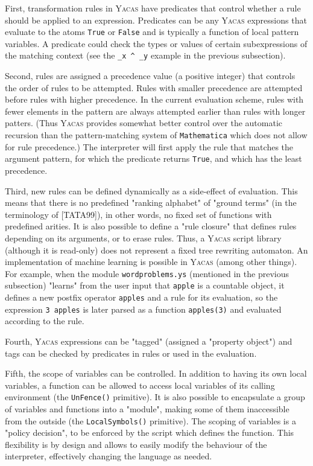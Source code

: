 \documentclass{llncs}
\begin{document}
First, transformation rules in \textsc{Yacas} have predicates that control whether a
rule should be applied to an expression. Predicates can be any \textsc{Yacas}
expressions that evaluate to the atoms \texttt{True} or \texttt{False} and is typically a
function of local pattern variables. A predicate could check the types or
values of certain subexpressions of the matching context (see the \verb|_x ^ _y|
example in the previous subsection).


Second, rules are assigned a precedence value (a positive integer) that
controls the order of rules to be attempted. Rules with smaller precedence are
attempted before rules with higher precedence. In the current evaluation
scheme, rules with fewer elements in the pattern are always attempted earlier
than rules with longer patters. (Thus \textsc{Yacas} provides somewhat better control
over the automatic recursion than the pattern-matching system of \texttt{Mathematica}
which does not allow for rule precedence.)
The interpreter will first apply the rule that matches the argument pattern,
for which the predicate returns \texttt{True}, and which has the least precedence.


Third, new rules can be defined dynamically as a side-effect of evaluation.
This means that there is no predefined "ranking alphabet" of "ground terms" (in
the terminology of [TATA99]), in other words, no fixed set of functions with
predefined arities. It is also possible to define a "rule closure" that defines
rules depending on its arguments, or to erase rules. Thus, a \textsc{Yacas} script
library (although it is read-only) does not represent a fixed tree rewriting
automaton. An implementation of machine learning is possible in \textsc{Yacas} (among
other things). For example, when the module \texttt{wordproblems.ys} (mentioned in the previous subsection) "learns" from the
user input that \texttt{apple} is a countable object, it defines a new postfix
operator \texttt{apples} and a rule for its evaluation, so the expression \texttt{3 apples} is later parsed as a
function \texttt{apples(3)} and evaluated according to the rule.


Fourth, \textsc{Yacas} expressions can be "tagged" (assigned a "property object") and
tags can be checked by predicates in rules or used in the evaluation.


Fifth, the scope of variables can be controlled. In addition to having its own
local variables, a function can be allowed to access local variables of its
calling environment (the \texttt{UnFence()} primitive).
It is also possible to encapsulate a group of variables and functions into a
"module", making some of them inaccessible from the outside (the \texttt{LocalSymbols()} primitive).
The scoping of variables is a "policy decision", to be enforced by the script
which  defines the function. This flexibility is by design and allows to easily
modify the behaviour of the interpreter, effectively changing the language
as needed.
\end{document}
